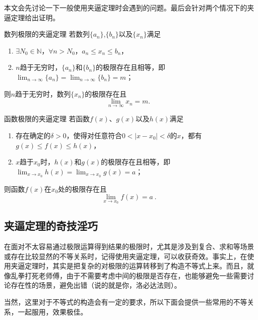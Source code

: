 本文会先讨论一下一般使用夹逼定理时会遇到的问题。最后会针对两个情况下的夹逼定理给出证明。

\begin{theorem}{数列极限的夹逼定理}\label{the_SquzTh_1}
若数列$\{a_n\}$,$\{b_n\}$以及$\{x_n\}$满足
\begin{enumerate}
\item $\exists N_0\in \mathbb{N}$，$\forall n>N_0$，$a_n\leq x_n\leq b_n$，
\item $n$趋于无穷时，$\{a_n\}$和$\{b_n\}$的极限存在且相等，即$\lim_{n\to\infty}\{a_n\}=\lim_{n\to\infty}\{b_n\}=m$；
\end{enumerate}
则$n$趋于无穷时，数列$\{x_n\}$的极限存在且
\begin{equation}
\lim_{n\to\infty}x_n =m.~
\end{equation}
\end{theorem}

\begin{theorem}{函数极限的夹逼定理}\label{the_SquzTh_2}
若函数$f(x)$、$g(x)$以及$h(x)$满足
\begin{enumerate}
\item 存在确定的$\delta>0$，使得对任意符合$0<|x-x_0|<\delta$的$x$，都有$g(x)\leq f(x)\leq h(x)$，
\item $x$趋于$x_0$时，$h(x)$和$g(x)$的极限存在且相等，即$\lim _{x\to x_0}h(x)=\lim _{x\to x_0}g(x)=a$；
\end{enumerate}
则函数$f(x)$在$x_0$处的极限存在且
\begin{equation}
\lim _{x\to x_0}f(x)=a~.
\end{equation}
\end{theorem}






\subsection{夹逼定理的奇技淫巧}

在面对不太容易通过极限运算得到结果的极限时，尤其是涉及到复合、求和等场景或存在比较显然的不等关系时，记得使用夹逼定理，可以收获奇效。事实上，在使用夹逼定理时，其实是把复杂的对极限的运算转移到了构造不等式上来。而且，就像乱拳打死老师傅，由于不需要考虑中间的极限是否存在，也能够避免一些需要讨论存在性的场景，避免出错（说的就是你，洛必达法则）。

当然，这里对于不等式的构造会有一定的要求，所以下面会提供一些常用的不等关系，一起服用，效果极佳。

